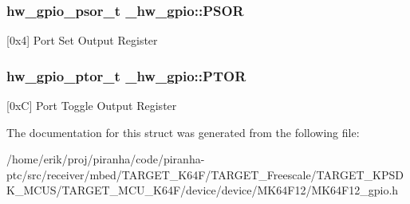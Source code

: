 \subsubsection[{\texorpdfstring{P\+S\+OR}{PSOR}}]{ {\bf hw\+\_\+gpio\+\_\+psor\+\_\+t} \+\_\+hw\+\_\+gpio\+::\+P\+S\+OR}\hypertarget{struct__hw__gpio_a8d13ed8da1d03b49b7845067edac7f07}{}\label{struct__hw__gpio_a8d13ed8da1d03b49b7845067edac7f07}
\mbox{[}0x4\mbox{]} Port Set Output Register 
\subsubsection[{\texorpdfstring{P\+T\+OR}{PTOR}}]{ {\bf hw\+\_\+gpio\+\_\+ptor\+\_\+t} \+\_\+hw\+\_\+gpio\+::\+P\+T\+OR}\hypertarget{struct__hw__gpio_ad0492d0354978a3251a02bad5fb8a6e7}{}\label{struct__hw__gpio_ad0492d0354978a3251a02bad5fb8a6e7}
\mbox{[}0xC\mbox{]} Port Toggle Output Register 

The documentation for this struct was generated from the following file\+:\begin{DoxyCompactItemize}
\item 
/home/erik/proj/piranha/code/piranha-\/ptc/src/receiver/mbed/\+T\+A\+R\+G\+E\+T\+\_\+\+K64\+F/\+T\+A\+R\+G\+E\+T\+\_\+\+Freescale/\+T\+A\+R\+G\+E\+T\+\_\+\+K\+P\+S\+D\+K\+\_\+\+M\+C\+U\+S/\+T\+A\+R\+G\+E\+T\+\_\+\+M\+C\+U\+\_\+\+K64\+F/device/device/\+M\+K64\+F12/M\+K64\+F12\+\_\+gpio.\+h\end{DoxyCompactItemize}

